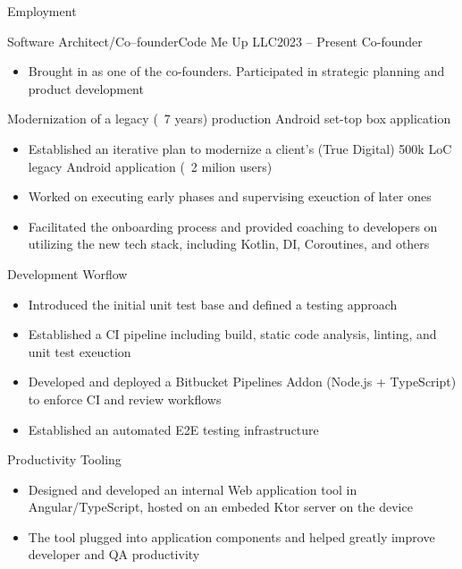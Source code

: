 \documentclass[]{mcdowellcv}
\begin{document}
	\makeheader

	\begin{cvsection}{Employment}
		\begin{cvsubsection}{Software Architect/Co--founder}{Code Me Up LLC}{2023 -- Present}
			Co-founder
			\begin{itemize}
				\item Brought in as one of the co-founders. Participated in strategic planning and product development \newline
			\end{itemize}

			Modernization of a legacy (~7 years) production Android set-top box application
			\begin{itemize}
				\item Established an iterative plan to modernize a client's (True Digital) 500k LoC legacy Android application (~2 milion users)
				\item Worked on executing early phases and supervising exeuction of later ones
				\item Facilitated the onboarding process and provided coaching to developers on utilizing the new tech stack, including Kotlin, DI, Coroutines, and others \newline
			\end{itemize}

			Development Worflow
			\begin{itemize}
				\item Introduced the initial unit test base and defined a testing approach
				\item Established a CI pipeline including build, static code analysis, linting, and unit test exeuction
				\item Developed and deployed a Bitbucket Pipelines Addon (Node.js + TypeScript) to enforce CI and review workflows
				\item Established an automated E2E testing infrastructure  \newline
			\end{itemize}

			Productivity Tooling
			\begin{itemize}
				\item Designed and developed an internal Web application tool in Angular/TypeScript, hosted on an embeded Ktor server on the device
				\item The tool plugged into application components and helped greatly improve developer and QA productivity \newline
			\end{itemize}


\end{cvsubsection}
\end{cvsection}
\end{document}
